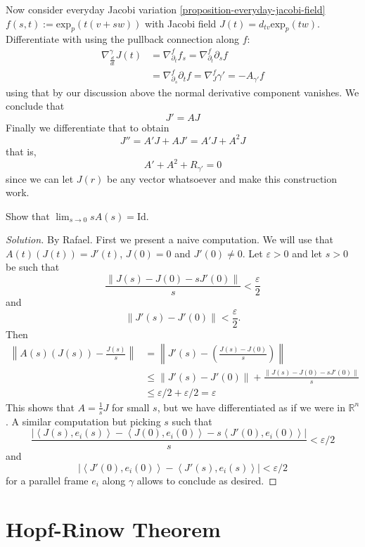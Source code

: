 Now consider everyday Jacobi variation \ref{proposition-everyday-jacobi-field}
 $f(s,t):=\text{exp}_p(t(v+sw))$ with Jacobi field
$J(t)=d_{tv}\text{exp}_p(tw)$. Differentiate with using the pullback connection
along $f$:
\begin{align*}
\nabla_{\frac{d}{dt}}^\gamma
J(t)&=\nabla_{\partial_t}^ff_s=\nabla_{\partial_t}^f \partial_sf\\
&=\nabla_{\partial_s}^f \partial_t f=\nabla_{J}^f \gamma' = -A_{\gamma'}f
\end{align*}
using that by our discussion above the normal derivative component vanishes. We
conclude that
\begin{equation}
\label{equation-Jacobi-field-derivative-is-shape-operator}
J'=AJ
\end{equation}
Finally we differentiate that to obtain
$$
J''=A'J+AJ'=A'J+A^2J
$$
that is,
\begin{equation}
\label{equation-Riccati}
A'+A^2+R_{\gamma'}=0
\end{equation}
since we can let $J(r)$ be any vector whatsoever and make this construction
work.
\begin{exercise}
\label{exercise-limit-of-shape-operator}
Show that $\lim_{s\to0}sA(s)=\text{Id}$.
\end{exercise}

\begin{proof}[Solution]
By Rafael. First we present a naive computation. We will use that
$A(t)(J(t))=J'(t)$,  $J(0)=0$ and $J'(0)\neq 0$. Let $\varepsilon>0$ and let
$s>0$ be such that
$$
\frac{\|J(s)-J(0)-sJ'(0)\|}{s}<\frac{\varepsilon}{2}
$$
and
$$
\|J'(s)-J'(0)\|<\frac{\varepsilon}{2}.
$$
Then
\begin{align*}
\left\|A(s)(J(s))-\frac{J(s)}{s}\right\|&
=\left\|J'(s)-\left(\frac{J(s)-J(0)}{s}\right)\right\|\\
&\leq \|J'(s)-J'(0)\|+\frac{\|J(s)-J(0)-sJ'(0)\|}{s}\\
&\leq\varepsilon/2+\varepsilon/2=\varepsilon
\end{align*}
This shows that $A=\frac{1}{s}J$ for small $s$, but we have differentiated as if
we were in $\mathbb{R}^n$. A similar computation but picking $s$ such that
$$
\frac{|\left<J(s),e_i(s)\right>-\left<J(0),e_i(0)\right>
-s\left<J'(0),e_i(0)\right>|}{s}<\varepsilon/2
$$
and
$$
|\left<J'(0),e_i(0)\right>-\left<J'(s),e_i(s)\right>|<\varepsilon/2
$$
for a parallel frame $e_i$ along $\gamma$ allows to conclude as desired.
\end{proof}

\section{Hopf-Rinow Theorem}
\label{section-Hopf-Rinow-theorem}

